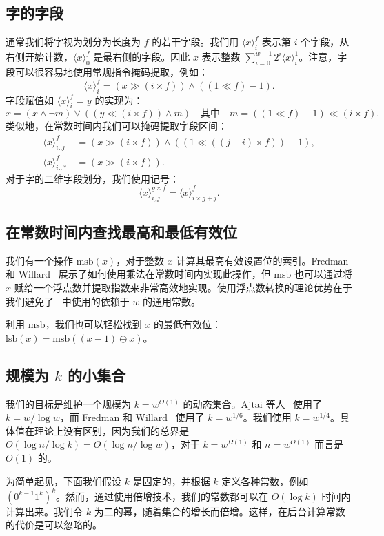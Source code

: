 \documentclass[11pt,a4paper]{ctexart}
\newcommand{\tto}{\text{0}}
\newcommand{\ttl}{\text{1}}
\newcommand{\lpiece}[3]{\langle #1 \rangle_{#2}^{#3}}
\newcommand{\AND}{\land}
\newcommand{\OR}{\lor}
\newcommand{\XOR}{\oplus}
\newcommand{\NOT}{\lnot}
\newcommand{\LSHIFT}{\ll}
\newcommand{\RSHIFT}{\gg}
\newcommand{\MSB}{\text{msb}}
\newcommand{\LSB}{\text{lsb}}
\begin{document}
\subsection{字的字段}

通常我们将字视为划分为长度为 $f$ 的若干字段。我们用 $\lpiece{x}{i}{f}$ 表示第 $i$ 个字段，从右侧开始计数，$\lpiece{x}{0}{f}$ 是最右侧的字段。因此 $x$ 表示整数 $\sum_{i=0}^{w-1} 2^i \lpiece{x}{i}{1}$。注意，字段可以很容易地使用常规指令掩码提取，例如：
\[
\lpiece{x}{i}{f}= (x \RSHIFT (i \times f)) \AND ((1 \LSHIFT f) - 1).
\]
字段赋值如 $\lpiece{x}{i}{f}=y$ 的实现为：
\[
x = (x \AND \NOT m) \OR ((y \LSHIFT (i \times f)) \AND m) \quad \text{其中} \quad m = ((1 \LSHIFT f) - 1) \LSHIFT (i \times f).
\]
类似地，在常数时间内我们可以掩码提取字段区间：
\begin{align*}
\lpiece{x}{i..j}{f} &= (x \RSHIFT (i \times f)) \AND ((1 \LSHIFT ((j-i) \times f)) - 1),\\
\lpiece{x}{i..*}{f} &= (x \RSHIFT (i \times f)).
\end{align*}
对于字的二维字段划分，我们使用记号：
\[
\lpiece{x}{i,j}{g \times f} = \lpiece{x}{i \times g + j}{f}.
\]

\subsection{在常数时间内查找最高和最低有效位}

我们有一个操作 $\MSB(x)$，对于整数 $x$ 计算其最高有效设置位的索引。Fredman 和 Willard~\cite{fredman93fusion} 展示了如何使用乘法在常数时间内实现此操作，但 $\MSB$ 也可以通过将 $x$ 赋给一个浮点数并提取指数来非常高效地实现。使用浮点数转换的理论优势在于我们避免了~\cite{fredman93fusion} 中使用的依赖于 $w$ 的通用常数。

利用 $\MSB$，我们也可以轻松找到 $x$ 的最低有效位：$\LSB(x) = \MSB((x-1) \XOR x)$。

\subsection{规模为 $k$ 的小集合}

我们的目标是维护一个规模为 $k = w^{\Theta(1)}$ 的动态集合。Ajtai 等人~\cite{ajtai84hashing} 使用了 $k = w / \log w$，而 Fredman 和 Willard~\cite{fredman93fusion} 使用了 $k = w^{1/6}$。我们使用 $k = w^{1/4}$。具体值在理论上没有区别，因为我们的总界是 $O(\log n/\log k) = O(\log n/\log w)$，对于 $k = w^{\Omega(1)}$ 和 $n = w^{O(1)}$ 而言是 $O(1)$ 的。

为简单起见，下面我们假设 $k$ 是固定的，并根据 $k$ 定义各种常数，例如 $(\tto^{k-1}\ttl^k)^k$。然而，通过使用倍增技术，我们的常数都可以在 $O(\log k)$ 时间内计算出来。我们令 $k$ 为二的幂，随着集合的增长而倍增。这样，在后台计算常数的代价是可以忽略的。
\end{document}
